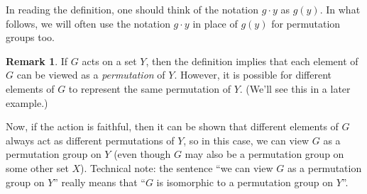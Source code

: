 \documentclass[11pt]{amsart}
\theoremstyle{plain}
\theoremstyle{definition}
\newtheorem*{remark*}{Remark}
\theoremstyle{remark}
\begin{document}
In reading the definition, one should think of the notation $g\cdot y$ as $g(y)$. In what follows, we will often use the notation $g\cdot y$ in place of $g(y)$ for permutation groups too.

\begin{remark*}
If $G$ acts on a set $Y$, then the definition  implies that each element of $G$ can be viewed as a \emph{permutation} of $Y$. However, it is possible for different elements of $G$ to represent the same permutation of $Y$. (We'll see this in a later example.) 

Now, if the action is faithful, then it can be shown that different elements of $G$ always act as different permutations of $Y$, so in this case, we can view $G$ as a permutation group on $Y$ (even though $G$ may also be a permutation group on some other set $X$). Technical note: the sentence ``we can view $G$ as a permutation group on $Y$'' really means that ``$G$ is isomorphic to a permutation group on $Y$''.
\end{remark*}
\end{document}
